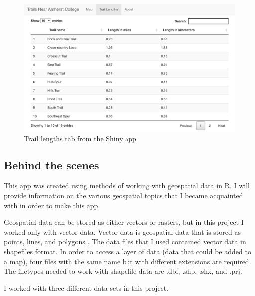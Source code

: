 \documentclass[12pt]{article}
\begin{document}
\begin{figure}

{\centering \includegraphics[width=0.9\linewidth]{images/screenshot-app-trail-lengths} 

}

\caption{Trail lengths tab from the Shiny app}\label{fig:unnamed-chunk-5}
\end{figure}

\hypertarget{behind-the-scenes}{%
\subsection{Behind the scenes}\label{behind-the-scenes}}

This app was created using methods of working with geospatial data in R.
I will provide information on the various geospatial topics that I
became acquainted with in order to make this app.

Geospatial data can be stored as either vectors or rasters, but in this
project I worked only with vector data. Vector data is geospatial data
that is stored as points, lines, and polygons
\citep{lovelaceGeocomputation2020}. The
\href{https://github.com/Amherst-STAT495F20/STAT495F20-project-Frontero/tree/main/data}{data
files} that I used contained vector data in
\href{https://en.wikipedia.org/wiki/Shapefile}{shapefiles} format. In
order to access a layer of data (data that could be added to a map),
four files with the same name but with different extensions are
required. The filetypes needed to work with shapefile data are .dbf,
.shp, .shx, and .prj.

I worked with three different data sets in this project.
\end{document}
